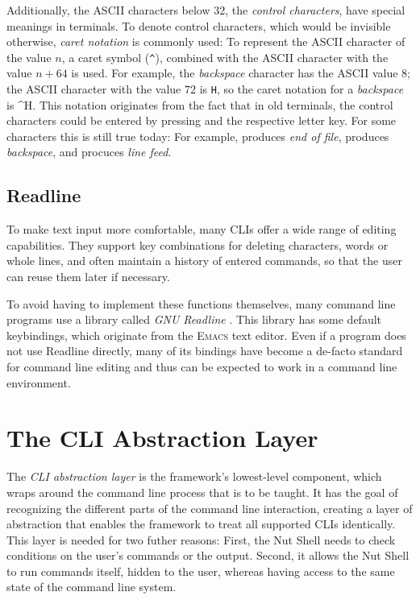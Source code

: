 \documentclass[paper=a4,twoside,abstract=on,cleardoublepage=empty,numbers=noenddot,toc=bib,toc=listof,12pt,appendixprefix=true]{scrreprt}
\newcommand{\escape}[1]{\textasciicircum #1}
\begin{document}
Additionally, the \textsc{ASCII} characters below 32, the \emph{control characters}, have special meanings in terminals.
To denote control characters, which would be invisible otherwise, \emph{caret notation} is commonly used: To represent the \textsc{ASCII} character of the value $n$, a caret symbol (\texttt{\textasciicircum}), combined with the \textsc{ASCII} character with the value $n+64$ is used. For example, the \emph{backspace} character has the \textsc{ASCII} value $8$; the \textsc{ASCII} character with the value $72$ is \texttt{H}, so the caret notation for a \emph{backspace} is \escape{H}. This notation originates from the fact that in old terminals, the control characters could be entered by pressing \keys{\ctrl} and the respective letter key. For some characters this is still true today: For example,  produces \emph{end of file},  produces \emph{backspace}, and  procuces \emph{line feed}.

\section{Readline}

To make text input more comfortable, many CLIs offer a wide range of editing capabilities. They support key combinations for deleting characters, words or whole lines, and often maintain a history of entered commands, so that the user can reuse them later if necessary.

To avoid having to implement these functions themselves, many command line programs use a library called \textsl{\textsc{GNU} Readline} \cite{readline}. This library has some default keybindings, which originate from the \textsc{Emacs} text editor. Even if a program does not use Readline directly, many of its bindings have become a de-facto standard for command line editing and thus can be expected to work in a command line environment.

\chapter{The \textsc{CLI} Abstraction Layer}
\label{sec:cliparser}

The \textsl{\textsc{CLI} abstraction layer} is the framework's lowest-level component, which wraps around the command line process that is to be taught. It has the goal of recognizing the different parts of the command line interaction, creating a layer of abstraction that enables the framework to treat all supported \textsc{CLI}s identically. This layer is needed for two futher reasons: First, the Nut Shell needs to check conditions on the user's commands or the output. Second, it allows the Nut Shell to run commands itself, hidden to the user, whereas having access to the same state of the command line system.
\end{document}
